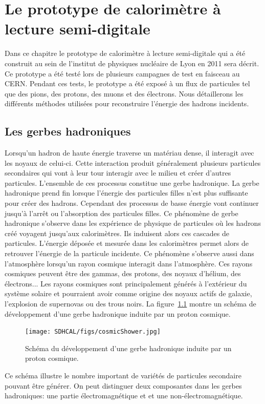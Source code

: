 \chapter{Le prototype de calorimètre à lecture semi-digitale}
\label{chap.sdhcal}
Dans ce chapitre le prototype de calorimètre à lecture semi-digitale qui a été construit au sein de l’institut de physiques nucléaire de Lyon en 2011 sera décrit. Ce prototype a été testé lors de plusieurs campagnes de test en faisceau au CERN. Pendant ces tests, le prototype a été exposé à un flux de particules tel que des pions, des protons, des muons et des électrons. Nous détaillerons les différents méthodes utilisées pour reconstruire l’énergie des hadrons incidents. 
\minitoc
\newpage


\section{Les gerbes hadroniques}
Lorsqu'un hadron de haute énergie traverse un matériau dense, il interagit avec les noyaux de celui-ci. Cette interaction produit généralement plusieurs particules secondaires qui vont à leur tour interagir avec le milieu et créer d'autres particules. L'ensemble de ces processus constitue une gerbe hadronique.  La gerbe hadronique prend fin lorsque l'énergie des particules filles n'est plus suffisante pour créer des hadrons. Cependant des processus de basse énergie vont continuer jusqu'à l'arrêt ou l'absorption des particules filles. Ce phénomène de gerbe hadronique s'observe dans les expérience de physique de particules où les hadrons créé voyagent jusqu'aux calorimètres. Ils induisent alors ces cascades de particules. L'énergie déposée et mesurée dans les calorimètres permet alors de retrouver l'énergie de la particule incidente. Ce phénomène s'observe aussi dans l'atmosphère lorsqu'un rayon cosmique interagit dans l'atmosphère. Ces rayons cosmiques peuvent être des gammas, des protons, des noyaux d'hélium, des électrons... Les rayons cosmiques sont principalement générés à l'extérieur du système solaire et pourraient avoir comme origine des noyaux actifs de galaxie, l'explosion de supernovas ou des trous noirs. La figure~\ref{fig:cosmicShowerScheme} montre un schéma de développement d'une gerbe hadronique induite par un proton cosmique.
\begin{figure}[!h]
  \begin{center}
    \texttt{[image: SDHCAL/figs/cosmicShower.jpg]}
    \caption{Schéma du développement d'une gerbe hadronique induite par un proton cosmique.}
    \label{fig:cosmicShowerScheme}
  \end{center}
\end{figure}
Ce schéma illustre le nombre important de variétés de particules secondaire pouvant être générer. On peut distinguer deux composantes dans les gerbes hadroniques: une partie électromagnétique et et une non-électromagnétique.\\

